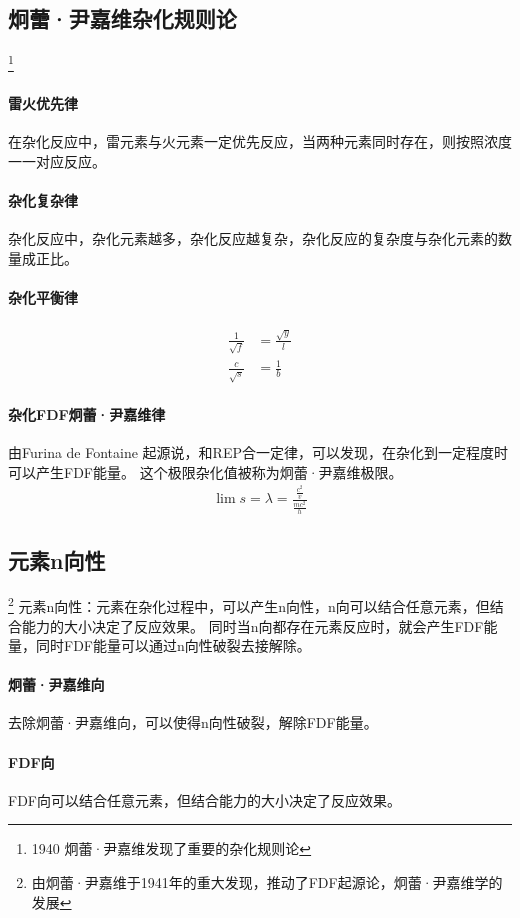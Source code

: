 \documentclass[12pt,a4paper]{article}%
\begin{document}
	\subsection{炯蕾·尹嘉维杂化规则论}\footnote[21]{1940 炯蕾·尹嘉维发现了重要的杂化规则论}


\paragraph{雷火优先律} 在杂化反应中，雷元素与火元素一定优先反应，当两种元素同时存在，则按照浓度一一对应反应。
\paragraph{杂化复杂律} 
杂化反应中，杂化元素越多，杂化反应越复杂，杂化反应的复杂度与杂化元素的数量成正比。
\paragraph{杂化平衡律} 
\begin{align}
	\frac{1}{\sqrt{f}} & = \frac{\sqrt{y}}{l}\\
	\frac{c}{\sqrt{s}} & = \frac{1}{b}
	\end{align}
	\paragraph{杂化FDF炯蕾·尹嘉维律}
由Furina de Fontaine 起源说，和REP合一定律，可以发现，在杂化到一定程度时可以产生FDF能量。
这个极限杂化值被称为炯蕾·尹嘉维极限。
\begin{align}
\lim  s = \lambda = \frac{{ \frac{{{c^2}}}{v}}}{{ \frac{{m{c^2}}}{h}}}  
\end{align}

	\subsection{元素n向性}\footnote[22]{由炯蕾·尹嘉维于1941年的重大发现，推动了FDF起源论，炯蕾·尹嘉维学的发展}
元素n向性：元素在杂化过程中，可以产生n向性，n向可以结合任意元素，但结合能力的大小决定了反应效果。
同时当n向都存在元素反应时，就会产生FDF能量，同时FDF能量可以通过n向性破裂去接解除。

\paragraph{炯蕾·尹嘉维向}  去除炯蕾·尹嘉维向，可以使得n向性破裂，解除FDF能量。
\paragraph{FDF向}  FDF向可以结合任意元素，但结合能力的大小决定了反应效果。
\end{document}
